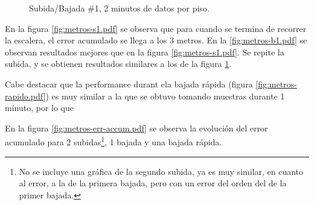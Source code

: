 \documentclass[main]{subfiles}
\begin{document}
\begin{figure}[h!]
\centering
{}
\caption{Subida/Bajada \#1, 2 minutos de datos por piso.}
\label{fig:subida-bajada-1-2}
\end{figure}

En la figura \ref{fig:metros-s1.pdf} se observa que para cuando se termina de recorrer la escalera, el error acumulado se llega a los 3 metros. En la \ref{fig:metros-b1.pdf} se observan resultados mejores que en la figura \ref{fig:metros-s1.pdf}. Se repite la subida, y se obtienen resultados similares a los de la figura \ref{fig:subida-bajada-1-2}.

Cabe destacar que la performance durant ela bajada rápida (figura \ref{fig:metros-rapido.pdf}) es muy similar a la que se obtuvo tomando muestras durante 1 minuto, por lo que 

En la figura \ref{fig:metros-err-accum.pdf} se observa la evolución del error acumulado para 2 subidas\footnote{No se incluye una gráfica de la segundo subida, ya es muy similar, en cuanto al error, a la de la primera bajada, pero con un error del orden del de la primer bajada.}, 1 bajada y una bajada rápida.
\end{document}
